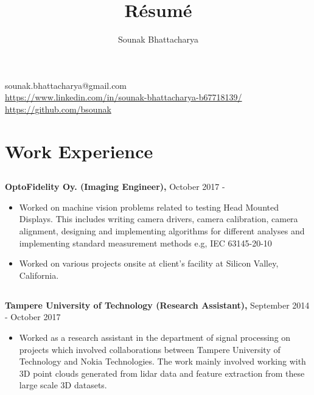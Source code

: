 \documentclass{article}
\renewcommand{\maketitle}{
\begin{center}
{\huge\bfseries
\theauthor}

\end{center}
}
\begin{document}
\title{R\'esum\'e}
\author{Sounak Bhattacharya}

\maketitle

\begin{center}
{\Large sounak.bhattacharya@gmail.com}\\
\url{https://www.linkedin.com/in/sounak-bhattacharya-b67718139/}\\
\url{https://github.com/bsounak} 
\end{center}

\section{Work Experience}
\subsection{}
\textbf{OptoFidelity Oy. (Imaging Engineer),} October 2017 -
\begin{itemize}[label={--}]
  \itemsep0em 

  \item Worked on machine vision problems related to testing Head Mounted
    Displays.  This includes writing camera drivers, camera calibration, camera
    alignment, designing and implementing algorithms for different analyses and
    implementing standard measurement methods e.g, IEC 63145-20-10

  \item Worked on various projects onsite at client's facility at Silicon
    Valley, California.
\end{itemize}

\subsection{}
\textbf{Tampere University of Technology (Research Assistant),} September 2014 -
  October 2017
\begin{itemize}[label={--}]
  \itemsep0em 

  \item Worked as a research assistant in the department of signal processing
    on projects which involved collaborations between Tampere University of
    Technology and Nokia Technologies.  The work mainly involved working with
    3D point clouds generated from lidar data and feature extraction from these
    large scale 3D datasets.
\end{itemize}
\end{document}
